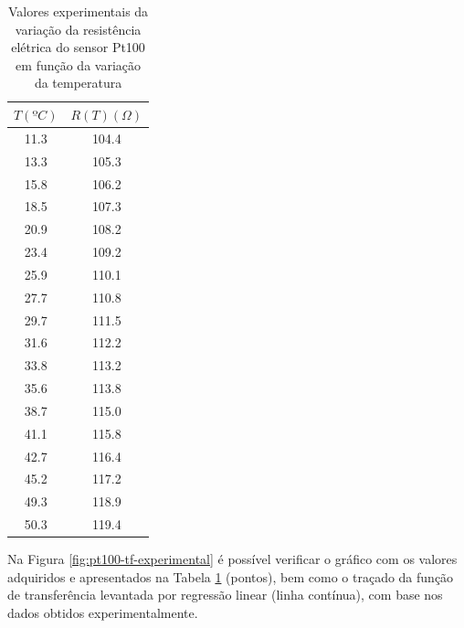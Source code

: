 \documentclass[a4paper]{instrumentacao}
\begin{document}
\begin{table}[H]
\centering
\caption{Valores experimentais da variação da resistência elétrica do sensor Pt100 em função da variação da temperatura}
\label{tab:pt100-resistencia-exp}
\begin{tabular}{|c|c|}
\hline
\textbf{$T(ºC)$} & \textbf{$R(T)(\Omega)$} \\ \hline
11.3           & 104.4                       \\ \hline
13.3           & 105.3                       \\ \hline
15.8           & 106.2                       \\ \hline
18.5           & 107.3                       \\ \hline
20.9           & 108.2                       \\ \hline
23.4           & 109.2                       \\ \hline
25.9           & 110.1                       \\ \hline
27.7           & 110.8                       \\ \hline
29.7           & 111.5                       \\ \hline
31.6           & 112.2                       \\ \hline
33.8           & 113.2                       \\ \hline
35.6           & 113.8                       \\ \hline
38.7           & 115.0                       \\ \hline
41.1           & 115.8                       \\ \hline
42.7           & 116.4                       \\ \hline
45.2           & 117.2                       \\ \hline
49.3           & 118.9                       \\ \hline
50.3           & 119.4                       \\ \hline
\end{tabular}
\end{table}

Na Figura \ref{fig:pt100-tf-experimental} é possível verificar o gráfico com os valores adquiridos e apresentados na Tabela \ref{tab:pt100-resistencia-exp} (pontos), bem como o traçado da função de transferência levantada por regressão linear (linha contínua), com base nos dados obtidos experimentalmente.
\end{document}
